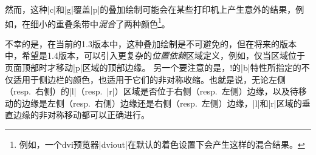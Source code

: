 
然而，这种|c|和|g|覆盖|p|的叠加绘制可能会在某些打印机上产生意外的结果，例如，在细小的重叠条带中\emph{混合}了两种颜色\footnote{例如，一个dvi预览器|dviout|在默认的着色设置下会产生这样的混合结果。}。


不幸的是，在当前的1.3版本中，这种叠加绘制是不可避免的，但在将来的版本中，希望是1.4版本，可以引入更复杂的\emph{位置依赖}区域定义，例如，仅当区域位于页面顶部时才移动|p|区域的顶部边缘。
% 
% 
另一个要注意的是，\!\twosided!的|b|特性所指定的\mirror{}不仅适用于侧边栏的颜色，也适用于它们的非对称收缩。也就是说，无论左侧（resp.\ 右侧）的|l|（resp.\ |r|）区域是否位于右侧（resp.\ 左侧）边缘，以及待移动的边缘是左侧（resp.\ 右侧）边缘还是右侧（resp.\ 左侧）边缘，|l|和|r|区域的垂直边缘的非对称移动都可以正确进行。
% 